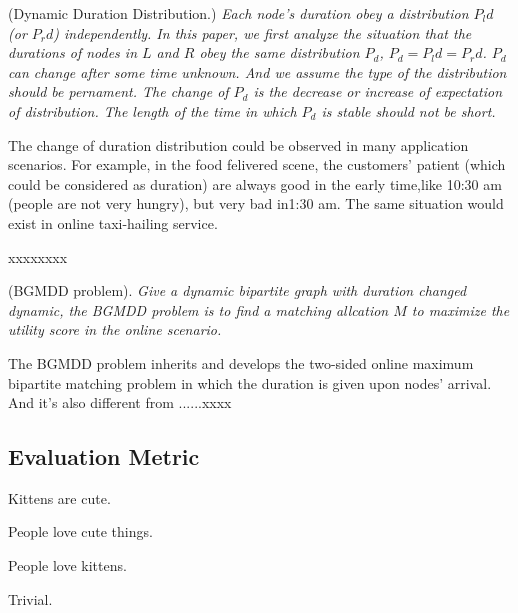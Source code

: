 \begin{definition}
(Dynamic Duration Distribution.) \emph{Each node's duration obey a distribution $P_ld$(or $P_rd$) independently. In this paper, we first analyze the situation that the durations of nodes in  $L$ and $R$ obey the same distribution $P_d$, $P_d=P_ld= P_rd$. $P_d$ can change after some time unknown.  And we assume the type of the distribution should be pernament. The change of $P_d$ is the decrease or increase of expectation of distribution.  The length of the time in which $P_d$ is stable should not be short. }
\end{definition}
\par The change of duration distribution could be observed in many application scenarios. For example, in the food felivered scene, the customers' patient (which could be considered as duration) are always good in the early time,like 10:30 am (people are not very hungry), but very bad in1:30 am. The same situation would exist in online taxi-hailing service.
\begin{example}
xxxxxxxx
\end{example}
\begin{definition}
(BGMDD problem). \emph{Give a dynamic bipartite graph with duration changed dynamic, the BGMDD problem is to find a matching allcation $M$ to maximize the utility score in the online scenario. }
\end{definition}
\par The BGMDD problem inherits and develops the two-sided online maximum bipartite matching problem in which the duration is  given upon nodes' arrival. And it's also different from ......xxxx

\subsection{ Evaluation Metric}
\begin{property}
Kittens are cute.
\end{property}

\begin{lemma}
People love cute things.
\end{lemma}

\begin{theorem}\label{theorem:TheFatTreeInApx}
People love kittens.
\end{theorem}

\begin{IEEEproof}
Trivial.
\end{IEEEproof}

